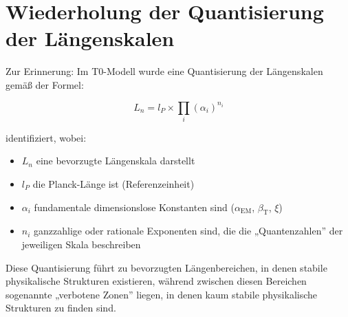 \documentclass[12pt,a4paper]{article}
\newcommand{\alphaEM}{\alpha_{\text{EM}}}
\newcommand{\betaT}{\beta_{\text{T}}}
\begin{document}
	\section{Wiederholung der Quantisierung der Längenskalen}
	
	Zur Erinnerung: Im T0-Modell wurde eine Quantisierung der Längenskalen gemäß der Formel:
	
	\begin{equation}
		L_n = l_P \times \prod_{i} (\alpha_i)^{n_i}
	\end{equation}
	
	identifiziert, wobei:
	\begin{itemize}
		\item $L_n$ eine bevorzugte Längenskala darstellt
		\item $l_P$ die Planck-Länge ist (Referenzeinheit)
		\item $\alpha_i$ fundamentale dimensionslose Konstanten sind ($\alphaEM$, $\betaT$, $\xi$)
		\item $n_i$ ganzzahlige oder rationale Exponenten sind, die die „Quantenzahlen'' der jeweiligen Skala beschreiben
	\end{itemize}
	
	Diese Quantisierung führt zu bevorzugten Längenbereichen, in denen stabile physikalische Strukturen existieren, während zwischen diesen Bereichen sogenannte „verbotene Zonen'' liegen, in denen kaum stabile physikalische Strukturen zu finden sind.
	
\end{document}
